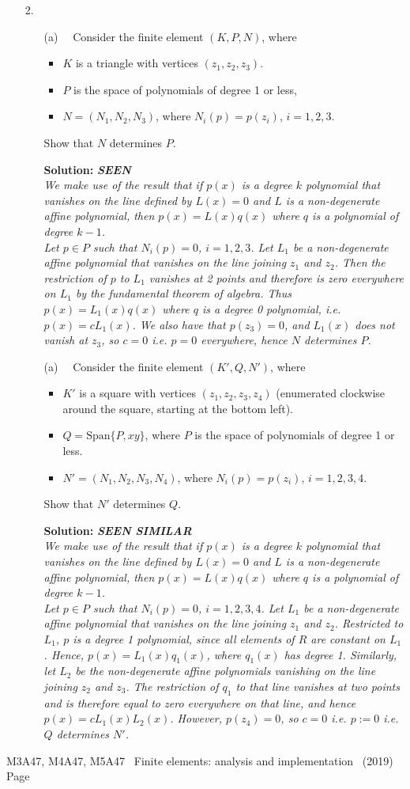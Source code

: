 \documentclass[12pt]{article}
\newcommand{\coursenum}{M3A47, M4A47, M5A47} %
\newcommand{\coursename}{Finite elements: analysis and implementation} %
\newcommand{\seen}{{\bfseries SEEN\\}}
\newcommand{\similar}{{\bfseries SEEN SIMILAR\\}}
\newcommand{\exammarks}[1]{\begin{flushright}[#1 marks]\end{flushright}}%
\newcommand{\soln}[1]{{\bfseries Solution:} {\itshape \color{blue} #1}}
\newcommand{\soln}[1]{}
\newcommand{\examyear}{2019}
\newenvironment{Question}[1] 
 {\begin{itemize} \item[\large #1.~~]}{\end{itemize} \medskip}
\newcommand{\EndPage}{
	\vfill \coursenum ~ \coursename ~
	(\examyear) \hfill Page \thepage \newpage
	}
\newcommand{\BeginParts}{\begin{itemize}}
\newcommand{\Part}[1]{\item [(#1)~~]}
\newcommand{\EndParts}{\end{itemize}}
\begin{document}
\begin{Question}{2}
  \BeginParts
  \Part{a}
  Consider the finite element $(K,P,N)$, where
  \begin{itemize}
  \item $K$ is a triangle with vertices $(z_1,z_2,z_3)$.
  \item $P$ is the space of polynomials of degree 1 or less,
  \item $N=(N_1,N_2,N_3)$, where $N_i(p)=p(z_i)$, $i=1,2,3$.
  \end{itemize}
  Show that $N$ determines $P$. \exammarks{10}
        \soln{\seen We make use of the result
      that if $p(x)$ is a degree $k$ polynomial that vanishes on the
      line defined by $L(x)=0$ and $L$ is a non-degenerate affine
      polynomial, then $p(x)=L(x)q(x)$ where $q$ is a polynomial of
      degree $k-1$. \\ Let $p \in P$ such that $N_i(p)=0$,
      $i=1,2,3$. Let $L_1$ be a non-degenerate affine polynomial
      that vanishes on the line joining $z_1$ and $z_2$. Then
      the restriction of $p$ to $L_1$ vanishes at 2 points and therefore
      is zero everywhere on $L_1$ by the fundamental theorem of algebra.
      Thus $p(x)=L_1(x)q(x)$ where $q$ is a degree 0 polynomial, i.e.
      $p(x) = cL_1(x)$. We also have that $p(z_3)=0$, and $L_1(x)$
      does not vanish at $z_3$, so $c=0$ i.e. $p=0$ everywhere, hence
      $N$ determines $P$.
    }

    \Part{a}
  Consider the finite element $(K',Q,N')$, where
  \begin{itemize}
  \item $K'$ is a square with vertices $(z_1,z_2,z_3,z_4)$ (enumerated
    clockwise around the square, starting at the bottom left).
  \item $Q=\mbox{Span}\{P,xy\}$, where $P$ is the space of polynomials
    of degree 1 or less.
  \item $N'=(N_1,N_2,N_3,N_4)$, where $N_i(p)=p(z_i)$, $i=1,2,3,4$.
  \end{itemize}
  Show that $N'$ determines $Q$.
\exammarks{10}
  \soln{\similar We make use of the result
    that if $p(x)$ is a degree $k$ polynomial that vanishes on the
    line defined by $L(x)=0$ and $L$ is a non-degenerate affine
    polynomial, then $p(x)=L(x)q(x)$ where $q$ is a polynomial of
    degree $k-1$. \\ Let $p \in P$ such that $N_i(p)=0$,
    $i=1,2,3,4$. Let $L_1$ be a non-degenerate affine polynomial that
    vanishes on the line joining $z_1$ and $z_2$. Restricted to $L_1$,
    $p$ is a degree 1 polynomial, since all elements of $R$ are
    constant on $L_1$. Hence, $p(x) = L_1(x)q_1(x)$, where $q_1(x)$
    has degree 1. Similarly, let $L_2$ be the non-degenerate affine
    polynomials vanishing on the line joining $z_2$ and $z_3$. The
    restriction of $q_1$ to that line vanishes at two points and is
    therefore equal to zero everywhere on that line, and hence
    $p(x)=cL_1(x)L_2(x)$. However, $p(z_4)=0$, so $c=0$ i.e. $p:=0$
    i.e. $Q$ determines $N'$.}
  \EndParts
\end{Question}
\EndPage
\end{document}
